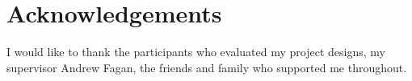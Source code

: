 \section*{Acknowledgements}

I would like to thank the participants who evaluated my project designs, my supervisor Andrew Fagan, the friends and family who supported me throughout.







